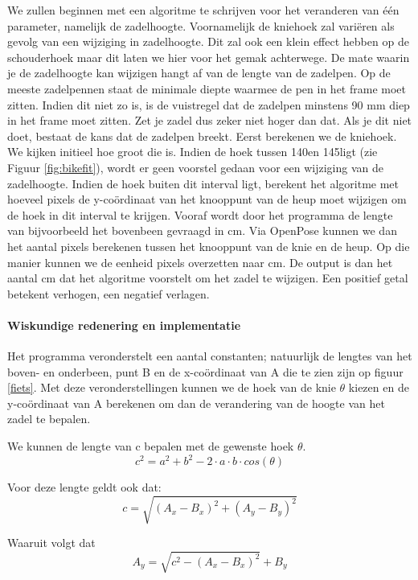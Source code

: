 \documentclass[a4paper,twoside,kulak]{kulakreport}
\begin{document}
We zullen beginnen met een algoritme te schrijven voor het veranderen van één parameter, namelijk de zadelhoogte. Voornamelijk de kniehoek zal variëren als gevolg van een wijziging in zadelhoogte. Dit zal ook een klein effect hebben op de schouderhoek maar dit laten we hier voor het gemak achterwege. De mate waarin je de zadelhoogte kan wijzigen hangt af van de lengte van de zadelpen. Op de meeste zadelpennen staat de minimale diepte waarmee de pen in het frame moet zitten. Indien dit niet zo is, is de vuistregel dat de zadelpen minstens 90 \si{mm} diep in het frame moet zitten. Zet je zadel dus zeker niet hoger dan dat. Als je dit niet doet, bestaat de kans dat de zadelpen breekt.
Eerst berekenen we de kniehoek. We kijken initieel hoe groot die is. Indien de hoek tussen 140\degree en 145\degree ligt (zie Figuur \ref{fig:bikefit}), wordt er geen voorstel gedaan voor een wijziging van de zadelhoogte. Indien de hoek buiten dit interval ligt, berekent het algoritme met hoeveel pixels de y-coördinaat van het knooppunt van de heup moet wijzigen om de hoek in dit interval te krijgen. Vooraf wordt door het programma de lengte van bijvoorbeeld het bovenbeen gevraagd in \si{cm}. Via OpenPose kunnen we dan het aantal pixels berekenen tussen het knooppunt van de knie en de heup. Op die manier kunnen we de eenheid pixels overzetten naar \si{cm}. De output is dan het aantal \si{cm} dat het algoritme voorstelt om het zadel te wijzigen. Een positief getal betekent verhogen, een negatief verlagen.

\paragraph{Wiskundige redenering en implementatie}
Het programma veronderstelt een aantal constanten; natuurlijk de lengtes van het boven- en onderbeen, punt B en de x-coördinaat van A die te zien zijn op figuur \ref{fiets}. Met deze veronderstellingen kunnen we de hoek van de knie $\theta$ kiezen en de y-coördinaat van A berekenen om dan de verandering van de hoogte van het zadel te bepalen.

We kunnen de lengte van c bepalen met de gewenste hoek $\theta$.
\[c^2 = a^2 + b^2 -2\cdot a \cdot b \cdot cos(\theta)\]

Voor deze lengte geldt ook dat:
\[c = \sqrt{(A_x - B_x)^2 + (A_y - B_y)^2}\]

Waaruit volgt dat
\[A_y = \sqrt{c^2 - (A_x - B_x)^2} + B_y\]
\end{document}
